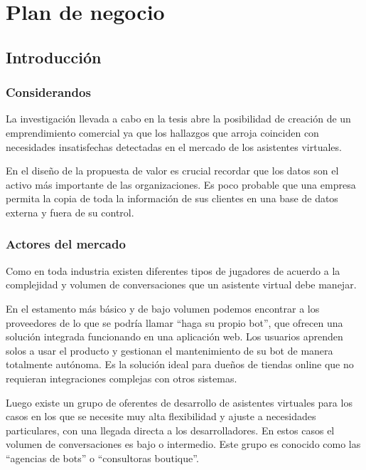 \section{Plan de negocio}
\label{anexo:plan-negocio}

\subsection{Introducción}

\subsubsection{Considerandos}

La investigación llevada a cabo en la tesis abre la posibilidad de creación de un emprendimiento comercial ya que los hallazgos que arroja coinciden con necesidades insatisfechas detectadas en el mercado de los asistentes virtuales.

En el diseño de la propuesta de valor es crucial recordar que los datos son el activo más importante de las organizaciones. Es poco probable que una empresa permita la copia de toda la información de sus clientes en una base de datos externa y fuera de su control.

\subsubsection{Actores del mercado}

Como en toda industria existen diferentes tipos de jugadores de acuerdo a la complejidad y volumen de conversaciones que un asistente virtual debe manejar.

En el estamento más básico y de bajo volumen podemos encontrar a los proveedores de lo que se podría llamar ``haga su propio bot'', que ofrecen una solución integrada funcionando en una aplicación web. Los usuarios aprenden solos a usar el producto y gestionan el mantenimiento de su bot de manera totalmente autónoma. Es la solución ideal para dueños de tiendas online que no requieran integraciones complejas con otros sistemas.

Luego existe un grupo de oferentes de desarrollo de asistentes virtuales para los casos en los que se necesite muy alta flexibilidad y ajuste a necesidades particulares, con una llegada directa a los desarrolladores. En estos casos el volumen de conversaciones es bajo o intermedio. Este grupo es conocido como las ``agencias de bots'' o ``consultoras boutique''.


